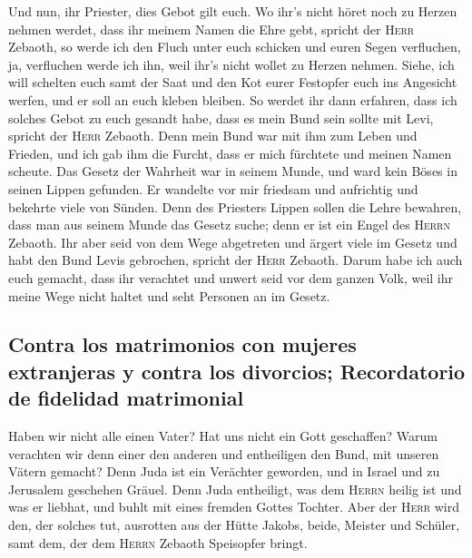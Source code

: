  Und nun, ihr Priester, dies Gebot gilt euch.
 Wo ihr's nicht höret noch zu Herzen nehmen werdet, dass
ihr meinem Namen die Ehre gebt, spricht der \textsc{Herr} Zebaoth, so
werde ich den Fluch unter euch schicken und euren Segen verfluchen, ja,
verfluchen werde ich ihn, weil ihr's nicht wollet zu Herzen nehmen.
 Siehe, ich will schelten euch samt der Saat und den Kot
eurer Festopfer euch ins Angesicht werfen, und er soll an euch kleben
bleiben.  So werdet ihr dann erfahren, dass ich solches
Gebot zu euch gesandt habe, dass es mein Bund sein sollte mit Levi,
spricht der \textsc{Herr} Zebaoth.  Denn mein Bund war mit
ihm zum Leben und Frieden, und ich gab ihm die Furcht, dass er mich
fürchtete und meinen Namen scheute.  Das Gesetz der
Wahrheit war in seinem Munde, und ward kein Böses in seinen Lippen
gefunden. Er wandelte vor mir friedsam und aufrichtig und bekehrte viele
von Sünden.  Denn des Priesters Lippen sollen die Lehre
bewahren, dass man aus seinem Munde das Gesetz suche; denn er ist ein
Engel des \textsc{Herrn} Zebaoth.  Ihr aber seid von dem
Wege abgetreten und ärgert viele im Gesetz und habt den Bund Levis
gebrochen, spricht der \textsc{Herr} Zebaoth.  Darum habe
ich auch euch gemacht, dass ihr verachtet und unwert seid vor dem ganzen
Volk, weil ihr meine Wege nicht haltet und seht Personen an im Gesetz.

\hypertarget{contra-los-matrimonios-con-mujeres-extranjeras-y-contra-los-divorcios-recordatorio-de-fidelidad-matrimonial}{%
\subsection{Contra los matrimonios con mujeres extranjeras y contra los
divorcios; Recordatorio de fidelidad
matrimonial}\label{contra-los-matrimonios-con-mujeres-extranjeras-y-contra-los-divorcios-recordatorio-de-fidelidad-matrimonial}}

 Haben wir nicht alle einen Vater? Hat uns nicht ein Gott
geschaffen? Warum verachten wir denn einer den anderen und entheiligen
den Bund, mit unseren Vätern gemacht?  Denn Juda ist ein
Verächter geworden, und in Israel und zu Jerusalem geschehen Gräuel.
Denn Juda entheiligt, was dem \textsc{Herrn} heilig ist und was er
liebhat, und buhlt mit eines fremden Gottes Tochter. 
Aber der \textsc{Herr} wird den, der solches tut, ausrotten aus der
Hütte Jakobs, beide, Meister und Schüler, samt dem, der dem
\textsc{Herrn} Zebaoth Speisopfer bringt.

